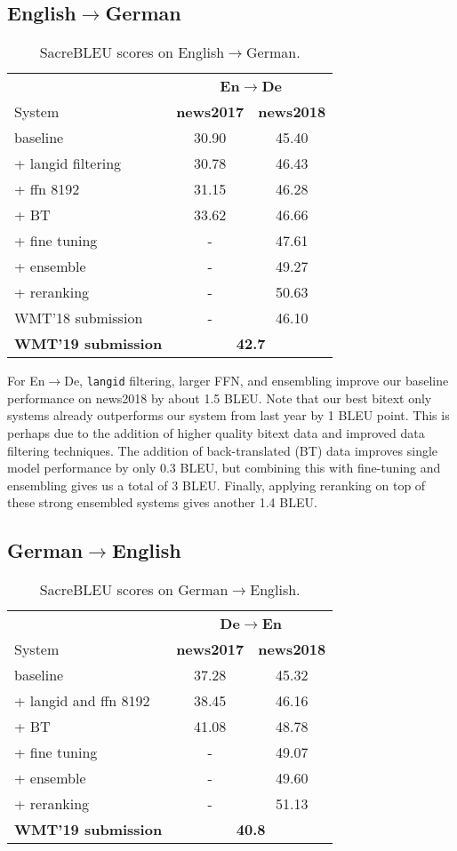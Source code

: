\documentclass[11pt,a4paper]{article}
\newcommand{\entode}{En$\rightarrow$De}
\newcommand{\detoen}{De$\rightarrow$En}
\begin{document}
\subsection{English$\rightarrow$German}
\begin{table}[t]
\centering
\begin{tabular}{lcc}
\toprule
& \multicolumn{2}{c}{\textbf{\entode{}}} \\
System & \bf news2017 & \bf news2018 \\ \midrule
baseline & 30.90 & 45.40 \\ 
+ langid filtering & 30.78 & 46.43 \\
+ ffn 8192 & 31.15 & 46.28 \\
+ BT & 33.62 & 46.66 \\
+ fine tuning & - & 47.61\\
+ ensemble & - & 49.27 \\
+ reranking & - & 50.63 \\
WMT'18 submission & - & 46.10 \\
\midrule
\bf WMT'19 submission & \multicolumn{2}{c}{\bf 42.7} \\ 
\bottomrule
\end{tabular}
\caption{SacreBLEU scores on English$\rightarrow$German. 
}
\label{tab:ablation_ende}
\end{table}

For \entode{}, \texttt{langid} filtering, larger FFN, and ensembling improve our baseline performance on news2018 by about 1.5 BLEU.
Note that our best bitext only systems already outperforms our system from last year by 1 BLEU point.
This is perhaps due to the addition of higher quality bitext data and improved data filtering techniques.
The addition of back-translated (BT) data improves single model performance by only 0.3 BLEU, but combining this with fine-tuning and ensembling gives us a total of 3 BLEU.
Finally, applying reranking on top of these strong ensembled systems gives another 1.4 BLEU.

\subsection{German$\rightarrow$English}
\begin{table}[t]
\centering
\begin{tabular}{lcc}
\toprule
& \multicolumn{2}{c}{\textbf{\detoen{}}} \\
System & \bf news2017 & \bf news2018 \\ \midrule
baseline & 37.28  & 45.32 \\ 
+ langid and ffn 8192 & 38.45 & 46.16 \\
+ BT & 41.08 & 48.78 \\
+ fine tuning & - & 49.07 \\
+ ensemble & - & 49.60 \\
+ reranking & - & 51.13\\
\midrule
\bf WMT'19 submission & \multicolumn{2}{c}{\bf 40.8} \\ 
\bottomrule
\end{tabular}
\caption{SacreBLEU scores on German$\rightarrow$English.}
\label{tab:ablation_deen}
\end{table}
\end{document}
